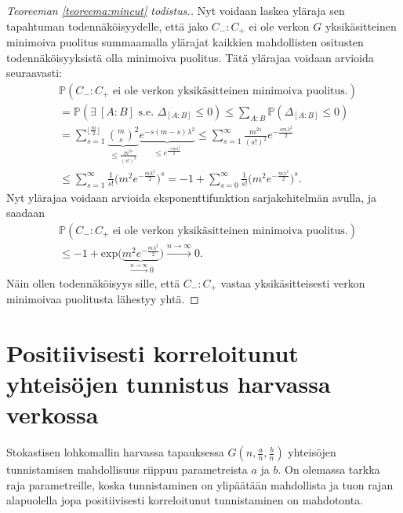 \documentclass[finnish,12pt,a4paper,pdftex,sci,utf8]{aaltothesis}
\newcommand\floor[1]{\lfloor#1\rfloor}
\begin{document}
\begin{proof}[Teoreeman \ref{teoreema:mincut} todistus.]
Nyt voidaan laskea yläraja sen tapahtuman todennäköisyydelle, että jako $C_-:C_+$ ei ole verkon $G$ yksikäsitteinen minimoiva puolitus summaamalla ylärajat kaikkien mahdollisten ositusten todennäköisyyksistä olla minimoiva puolitus. Tätä ylärajaa voidaan arvioida seuraavasti:
\begin{align*}
	&\mathbb{P}(C_-:C_+ \text{ ei ole verkon yksikäsitteinen minimoiva puolitus.}) \\
	&= \mathbb{P}(\exists \ [ A:B ] \text { s.e. } \Delta_{ [A:B] }
        \leq 0) \leq \sum_{A:B}^{}\mathbb{P}( \Delta_{ [A:B] } \leq 0) \\
	&= \sum_{s=1}^{\floor{\frac{m}{2}}} \underbrace{\binom{m}{s}^2}_{\leq \frac{m^{2s}}{(s!)^2}} \underbrace{e^{-s(m-s)\lambda^2}}_{ \leq e^{ \frac{-sm \lambda^2  }{2}}}
        \leq \sum_{s=1}^{\infty} \frac{m^{2s}}{(s!)^2} e^{-\frac{sm \lambda^2}{2}} \\
	&\leq \sum_{s=1}^{\infty} \frac{1}{s!} \big( m^{2}e^{-\frac{m \lambda^2}{2}} \big)^s
        = -1 + \sum_{s=0}^{\infty} \frac{1}{s!} \big( m^{2}e^{-\frac{m \lambda^2}{2}} \big)^s.
\end{align*}
Nyt ylärajaa voidaan arvioida eksponenttifunktion sarjakehitelmän avulla, ja saadaan
\begin{align*}
	&\mathbb{P}(C_-:C_+ \text{ ei ole verkon yksikäsitteinen minimoiva puolitus.}) \\
	&\leq -1 + \text{exp}\big(\underbrace{m^2  e^{-\frac{m \lambda^2}{2} }}_{\xrightarrow{n \rightarrow \infty} 0} \big) \xrightarrow{n \rightarrow \infty} 0.
\end{align*}
Näin ollen todennäköisyys sille, että $C_-:C_+$ vastaa yksikäsitteisesti verkon minimoivaa puolitusta lähestyy yhtä.
\end{proof}

\clearpage
\section{Positiivisesti korreloitunut yhteisöjen tunnistus harvassa verkossa}
Stokastisen lohkomallin harvassa tapauksessa $G(n,\frac{a}{n}, \frac{b}{n})$ yhteisöjen tunnistamisen mahdollisuus riippuu parametreista $a$ ja $b$. On olemassa tarkka raja parametreille, koska tunnistaminen on ylipäätään mahdollista ja tuon rajan alapuolella jopa positiivisesti korreloitunut tunnistaminen on mahdotonta.
\end{document}
